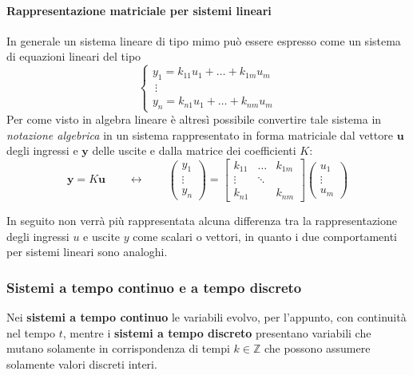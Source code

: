     	\paragraph{Rappresentazione matriciale per sistemi lineari} In generale un sistema lineare di tipo mimo può essere espresso come un sistema di equazioni lineari del tipo
    	\[\begin{cases}
    		y_1 = k_{11} u_1 + \dots + k_{1m} u_m \\
    		\ \vdots \\ 
    		y_n = k_{n1} u_1 + \dots + k_{nm} u_m
    	\end{cases}\]
    	Per come visto in algebra lineare è altresì possibile convertire tale sistema in \textit{notazione algebrica} in un sistema rappresentato in forma matriciale dal vettore $\boldsymbol u$ degli ingressi e $\boldsymbol y$ delle uscite e dalla matrice dei coefficienti $ K$:
    	\[ \boldsymbol{y} = K \boldsymbol{u} \qquad \leftrightarrow\qquad \begin{pmatrix}
    		y_1 \\ \vdots \\ y_n
    	\end{pmatrix} = \begin{bmatrix}
    		k_{11} & \dots & k_{1m} \\ 
    		\vdots & \ddots \\
    		k_{n1} & & k_{nm}
    	\end{bmatrix} \begin{pmatrix}
    		u_1 \\ \vdots \\ u_m
    	\end{pmatrix}\]
    	\begin{osservazione}
    		In seguito non verrà più rappresentata alcuna differenza tra la rappresentazione degli ingressi $u$ e uscite $y$ come scalari o vettori, in quanto i due comportamenti per sistemi lineari sono analoghi.
    	\end{osservazione}
    	
    \subsubsection{Sistemi a tempo continuo e a tempo discreto}
    	Nei \textbf{sistemi a tempo continuo} le variabili evolvo, per l'appunto, con continuità nel tempo $t$, mentre i \textbf{sistemi a tempo discreto} presentano variabili che mutano solamente in corrispondenza di tempi $k\in \mathds Z$ che possono assumere solamente valori discreti interi.
    	
